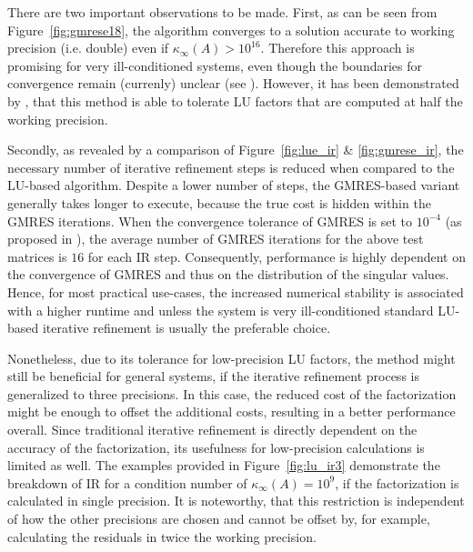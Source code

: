 There are two important observations to be made. First, as can be seen from Figure~\hyperref[fig:gmrese18]{\ref{fig:gmrese18}}, the algorithm converges to a solution accurate to working precision (i.e. double) even if $\kappa_\infty(A) > 10^{16}$. Therefore this approach is promising for very ill-conditioned systems, even though the boundaries for convergence remain (currenly) unclear (see \cite{carson_new_2017}). However, it has been demonstrated by \cite{carson_accelerating_2018}, that this method is able to tolerate LU factors that are computed at half the working precision. 

Secondly, as revealed by a comparison of Figure~\hyperref[fig:lue_ir]{\ref{fig:lue_ir}} \& \hyperref[fig:gmrese18_ir]{\ref{fig:gmrese_ir}}, the necessary number of iterative refinement steps is reduced when compared to the LU-based algorithm. Despite a lower number of steps, the GMRES-based variant generally takes longer to execute, because the true cost is hidden within the GMRES iterations. When the convergence tolerance of GMRES is set to $10^{-4}$ (as proposed in \cite{carson_new_2017}), the average number of GMRES iterations for the above test matrices is $16$ for each IR step. Consequently, performance is highly dependent on the convergence of GMRES and thus on the distribution of the singular values. Hence, for most practical use-cases, the increased numerical stability is associated with a higher runtime and unless the system is very ill-conditioned standard LU-based iterative refinement is usually the preferable choice.

Nonetheless, due to its tolerance for low-precision LU factors, the method might still be beneficial for general systems, if the iterative refinement process is generalized to three precisions. In this case, the reduced cost of the factorization might be enough to offset the additional costs, resulting in a better performance overall. Since traditional iterative refinement is directly dependent on the accuracy of the factorization, its usefulness for low-precision calculations is limited as well. The examples provided in Figure~\hyperref[fig:lu_ir3]{\ref{fig:lu_ir3}} demonstrate the breakdown of IR for a condition number of $\kappa_\infty (A)=10^9$, if the factorization is calculated in single precision. It is noteworthy, that this restriction is independent of how the other precisions are chosen and cannot be offset by, for example, calculating the residuals in twice the working precision.


